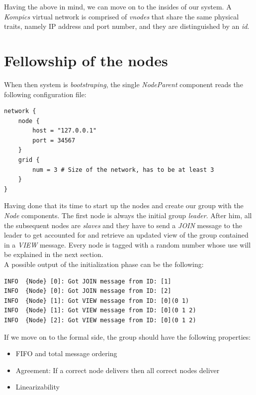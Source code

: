\documentclass[a4paper, 11pt]{article}
\begin{document}
\noindent Having the above in mind, we can move on to the insides of our system. A \textit{Kompics} virtual network is comprised of \textit{vnodes} that share the same physical traits, namely IP address and port number, and they are distinguished by an \textit{id}. \\

\section{Fellowship of the nodes}

\noindent When then system is \textit{bootstraping}, the single \textit{NodeParent} component reads the following configuration file: 

\begin{verbatim}
network {
    node {
        host = "127.0.0.1"
        port = 34567
    }
    grid {
        num = 3 # Size of the network, has to be at least 3
    }
}
\end{verbatim}

\noindent Having done that its time to start up the nodes and create our group with the \textit{Node} components. The first node is always the initial group \textit{leader}. After him, all the subsequent nodes are \textit{slaves} and they have to send a \textit{JOIN} message to the leader to get accounted for and retrieve an updated view of the group contained in a \textit{VIEW} message. Every node is tagged with a random number whose use will be explained in the next section. \\

\noindent A possible output of the initialization phase can be the following:

\begin{verbatim}
INFO  {Node} [0]: Got JOIN message from ID: [1]
INFO  {Node} [0]: Got JOIN message from ID: [2]
INFO  {Node} [1]: Got VIEW message from ID: [0](0 1)
INFO  {Node} [1]: Got VIEW message from ID: [0](0 1 2)
INFO  {Node} [2]: Got VIEW message from ID: [0](0 1 2)
\end{verbatim}

\noindent If we move on to the formal side, the group should have the following properties\cite{chordy}\cite{groupy}:
\begin{itemize}
	\item FIFO and total message ordering
	\item Agreement: If a correct node delivers then all correct nodes deliver
	\item Linearizability
\end{itemize}
\end{document}
